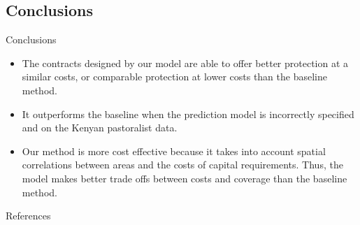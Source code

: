 \documentclass{beamer}
\begin{document}
\subsection{Conclusions}
\begin{frame}{Conclusions}
    \begin{itemize}
    \setlength\itemsep{2em}
        \item The contracts designed by our model are able to offer better protection at a similar costs, or comparable protection at lower costs than the baseline method. 
        \item It outperforms the baseline when the prediction model is incorrectly specified and on the Kenyan pastoralist data. 
        \item Our method is more cost effective because it takes into account spatial correlations between  areas and the costs of capital requirements. Thus, the model makes better trade offs between costs and coverage than the baseline method. 
        
    \end{itemize}
\end{frame}


\begin{frame}{References}
\printbibliography
\end{frame}
\end{document}
